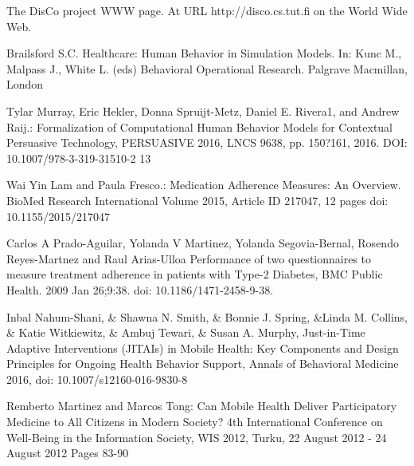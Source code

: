 \documentclass{llncs}
\begin{document}

\begin{thebibliography}{99}


 The DisCo project WWW page. At URL http://disco.cs.tut.fi on the World Wide Web.

 Brailsford S.C. Healthcare: Human Behavior in Simulation Models. In: Kunc M., Malpass J., White L. (eds) Behavioral Operational Research. Palgrave Macmillan, London

 Tylar Murray, Eric Hekler, Donna Spruijt-Metz, Daniel E. Rivera1, and Andrew Raij.: Formalization of Computational Human Behavior Models for Contextual Persuasive Technology, PERSUASIVE 2016, LNCS 9638, pp. 150?161, 2016. DOI: 10.1007/978-3-319-31510-2 13

 Wai Yin Lam and Paula Fresco.: Medication Adherence Measures: An Overview. BioMed Research International Volume 2015, Article ID 217047, 12 pages doi: 10.1155/2015/217047


 Carlos A Prado-Aguilar, Yolanda V Martinez, Yolanda Segovia-Bernal, Rosendo Reyes-Martnez and Raul Arias-Ulloa Performance of two questionnaires to measure treatment adherence in patients with Type-2 Diabetes, BMC Public Health. 2009 Jan 26;9:38. doi: 10.1186/1471-2458-9-38.


 Inbal Nahum-Shani, \& Shawna N. Smith,  \& Bonnie J. Spring,  \&Linda M. Collins,  \& Katie Witkiewitz,  \& Ambuj Tewari, \& Susan A. Murphy, Just-in-Time Adaptive Interventions (JITAIs) in Mobile Health: Key Components and Design Principles for Ongoing Health Behavior Support, Annals of Behavioral Medicine 2016, doi: 10.1007/s12160-016-9830-8

 Remberto Martinez and Marcos Tong: Can Mobile Health Deliver Participatory Medicine to  All Citizens in Modern Society? 4th International Conference on Well-Being in the Information Society, WIS 2012, Turku, 22 August 2012 - 24 August 2012 Pages 83-90


\end{thebibliography}
\end{document}
